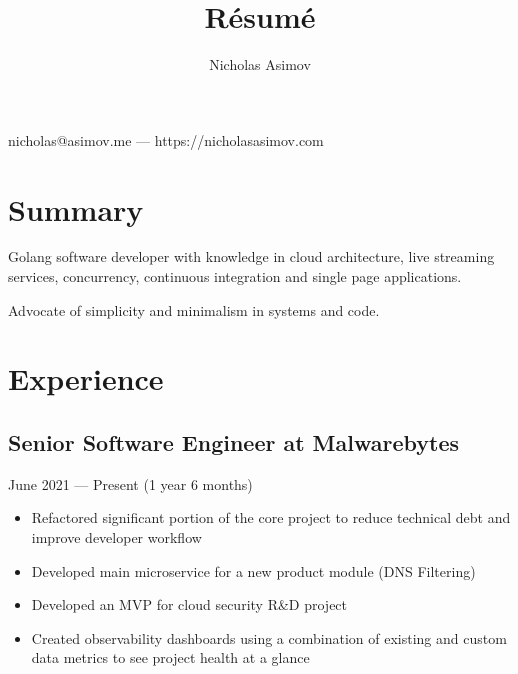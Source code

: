 \documentclass[a4paper,11pt]{article}
\makeatletter
\renewcommand{\maketitle}{
    \begin{center}
        {
            \huge
            \bfseries
            \theauthor
        }
 
        \vspace{.25em}
        nicholas@asimov.me --- https://nicholasasimov.com
    \end{center}
}
\makeatother
\begin{document}
\title{R\'esum\'e}
\author{Nicholas Asimov}

\maketitle

\section{Summary}

Golang software developer with knowledge in cloud architecture, live streaming services, concurrency,
continuous integration and single page applications.
\newline

\noindent
Advocate of simplicity and minimalism in systems and code.

\section{Experience}

\subsection{Senior Software Engineer at Malwarebytes}
June 2021 --- Present (1 year 6 months)
\begin{itemize}[noitemsep]
    \renewcommand{\labelitemi}{---}

    \item Refactored significant portion of the core project to reduce technical debt and improve developer workflow
    \item Developed main microservice for a new product module (DNS Filtering)
    \item Developed an MVP for cloud security R\&D project
    \item Created observability dashboards using a combination of existing and custom data metrics to see project health at a glance
\end{itemize}
\end{document}
